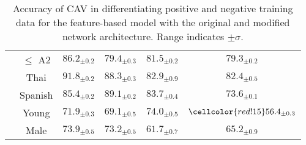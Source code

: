\begin{table}[H]
\begin{tabular}{|c|c|cc|cc|}
                          & $\leq$ A2                                               & \multicolumn{1}{c|}{$86.2_{\pm 0.2}$}                   & $79.4_{\pm 0.3}$
                          & \multicolumn{1}{c|}{$81.5_{\pm 0.2}$}                   & $79.3_{\pm 0.2}$                                                                             \\ \cline{2-6}

                          & Thai                                                    & \multicolumn{1}{c|}{$91.8_{\pm 0.2}$}                   & $88.3_{\pm 0.3}$
                          & \multicolumn{1}{c|}{$82.9_{\pm 0.9}$}                   & $82.4_{\pm 0.5}$                                                                             \\

                          & Spanish                                                 & \multicolumn{1}{c|}{$85.4_{\pm 0.2}$}                   & $89.1_{\pm 0.2}$
                          & \multicolumn{1}{c|}{$83.7_{\pm 0.4}$}                   & $73.6_{\pm 0.1}$                                                                             \\ \cline{2-6}

                          & Young                                                   & \multicolumn{1}{c|}{$71.9_{\pm 0.3}$}                   & $69.1_{\pm 0.5}$
                          & \multicolumn{1}{c|}{$74.0_{\pm 0.5}$}                   & $\cellcolor{red!15}56.4_{\pm 0.3}$                                                           \\

                          & Male                                                    & \multicolumn{1}{c|}{$73.9_{\pm 0.5}$}                   & $73.2_{\pm 0.5}$
                          & \multicolumn{1}{c|}{$61.7_{\pm 0.7}$}                   & $65.2_{\pm 0.9}$                                                                             \\ \hline
    \end{tabular}
    \caption{Accuracy of CAV in differentiating positive and negative training data for the feature-based model with the original and modified network architecture. Range indicates $\pm \sigma$.}
    \label{tab:CAV_accuracy_bert_like}
\end{table}

